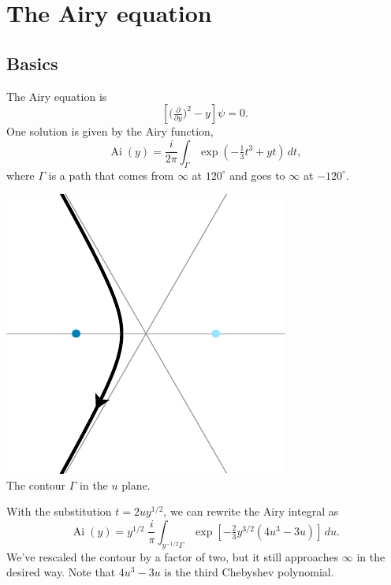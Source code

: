 \documentclass{article}
\theoremstyle{plain}
\DeclareMathOperator{\Ai}{Ai}
\begin{document}
\section{The Airy equation}
\subsection{Basics}
The Airy equation is
\begin{equation}\label{eqn:airy}
\left[\big(\tfrac{\partial}{\partial y}\big)^2 - y\right] \psi = 0.
\end{equation}
One solution is given by the Airy function,
\[ \Ai(y) = \frac{i}{2\pi} \int_{\Gamma} \exp\left(-\tfrac{1}{3}t^3 + yt\right)\,dt, \]
where $\Gamma$ is a path that comes from $\infty$ at $120^\circ$ and goes to $\infty$ at $-120^\circ$.
\begin{center}
\includegraphics{figures/u_contour_3.pdf} \\[1em]
{\small The contour $\Gamma$ in the $u$ plane.}
\end{center}
With the substitution $t = 2uy^{1/2}$, we can rewrite the Airy integral as
\[ \Ai(y) = y^{1/2}\;\frac{i}{\pi} \int_{y^{-1/2} \Gamma} \exp\left[-\tfrac{2}{3}y^{3/2} \left(4u^3 - 3u\right)\right]\,du. \]
We've rescaled the contour by a factor of two, but it still approaches $\infty$ in the desired way. Note that $4u^3 - 3u$ is the third Chebyshev polynomial.
\end{document}
